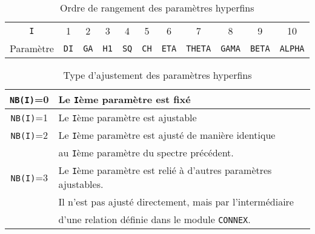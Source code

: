 \begin{table}[!h]
\caption{\label{tab:position_param}Ordre de rangement des paramètres hyperfins}
\begin{tabular}{c|cccccccccc}
\lstinline{I} & 1  &2  & 3 & 4 & 5 & 6 & 7 & 8 & 9 & 10\\
Paramètre & \lstinline{DI} &\lstinline{GA} &\lstinline{H1}&  \lstinline{SQ}&  \lstinline{CH} & \lstinline{ETA}& \lstinline{THETA}&\lstinline{GAMA}& \lstinline{BETA}&\lstinline{ALPHA}
\end{tabular}
\end{table}

 \begin{table}[!h]
 \caption{\label{tab:NB}Type d'ajustement des paramètres hyperfins}
 \begin{tabular}{c|l}
  \lstinline{NB(I)}=0 & Le \lstinline{I}ème paramètre est fixé \\
  \hline
  \lstinline{NB(I)}=1 & Le \lstinline{I}ème paramètre est ajustable \\
  \hline
  \lstinline{NB(I)}=2 & Le \lstinline{I}ème paramètre est ajusté de manière identique \\
    & au \lstinline{I}ème paramètre du spectre précédent. \\
  \hline
  \lstinline{NB(I)}=3 & Le \lstinline{I}ème paramètre est relié à d'autres paramètres ajustables.\\
    & Il n'est pas ajusté directement,  mais par l'intermédiaire\\
    &  d'une relation définie dans le module \lstinline{CONNEX}. 
 \end{tabular}
\end{table}
\FloatBarrier

